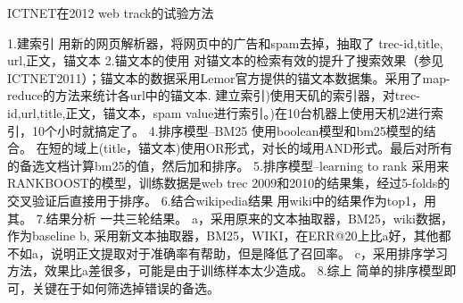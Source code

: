 \documentclass{article}
\begin{document}
\begin{CJK}{UTF8}{gkai}

ICTNET在2012 web track的试验方法\newline

1.建索引\newline
用新的网页解析器，将网页中的广告和spam去掉，抽取了 trec-id,title, url,正文，锚文本\newline
2.锚文本的使用\newline
对锚文本的检索有效的提升了搜索效果（参见ICTNET2011）；锚文本的数据采用Lemor官方提供的锚文本数据集。采用了map-reduce的方法来统计各url中的锚文本. 建立索引)使用天矶的索引器，对trec-id,url,title,正文，锚文本，spam value进行索引。)在10台机器上使用天机2进行索引，10个小时就搞定了。\newline
4.排序模型--BM25\newline
使用boolean模型和bm25模型的结合。\newline
在短的域上(title，锚文本)使用OR形式，对长的域用AND形式。最后对所有的备选文档计算bm25的值，然后加和排序。\newline
5.排序模型--learning to rank\newline
采用来RANKBOOST的模型，训练数据是web trec 2009和2010的结果集，经过5-folds的交叉验证后直接用于排序。\newline
6.结合wikipedia结果\newline
用wiki中的结果作为top1，用其。
7.结果分析\newline
一共三轮结果。\newline
a，采用原来的文本抽取器，BM25，wiki数据，作为baseline\newline
b, 采用新文本抽取器，BM25，WIKI，在ERR@20上比a好，其他都不如a，说明正文提取对于准确率有帮助，但是降低了召回率。\newline
c，采用排序学习方法，效果比a差很多，可能是由于训练样本太少造成。\newline
8.综上\newline
简单的排序模型即可，关键在于如何筛选掉错误的备选。\newline
\end{CJK}
\end{document}
